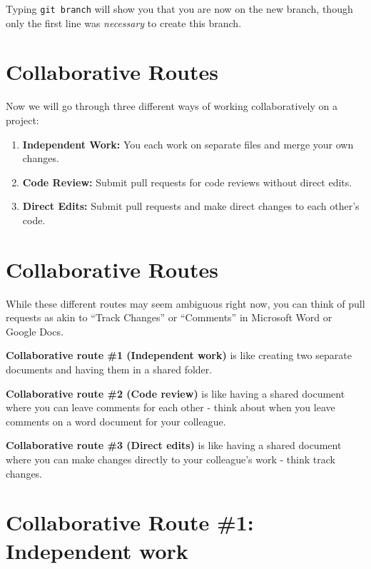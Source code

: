 \documentclass[
]{book}
\providecommand{\tightlist}{%
  \setlength{\itemsep}{0pt}\setlength{\parskip}{0pt}}
\begin{document}
Typing \texttt{git\ branch} will show you that you are now on the new branch, though only the first line was \emph{necessary} to create this branch.

\hypertarget{collaborative-routes}{%
\section{Collaborative Routes}\label{collaborative-routes}}

Now we will go through three different ways of working collaboratively on a project:

\begin{enumerate}
\def\labelenumi{\arabic{enumi}.}
\tightlist
\item
  \textbf{Independent Work:} You each work on separate files and merge your own changes.
\item
  \textbf{Code Review:} Submit pull requests for code reviews without direct edits.
\item
  \textbf{Direct Edits:} Submit pull requests and make direct changes to each other's code.
\end{enumerate}

\hypertarget{collaborative-routes-1}{%
\section{Collaborative Routes}\label{collaborative-routes-1}}

While these different routes may seem ambiguous right now, you can think of pull requests as akin to ``Track Changes'' or ``Comments'' in Microsoft Word or Google Docs.

\textbf{Collaborative route \#1 (Independent work)} is like creating two separate documents and having them in a shared folder.

\textbf{Collaborative route \#2 (Code review)} is like having a shared document where you can leave comments for each other - think about when you leave comments on a word document for your colleague.

\textbf{Collaborative route \#3 (Direct edits)} is like having a shared document where you can make changes directly to your colleague's work - think track changes.

\hypertarget{collaborative-route-1-independent-work}{%
\section{Collaborative Route \#1: Independent work}\label{collaborative-route-1-independent-work}}
\end{document}
